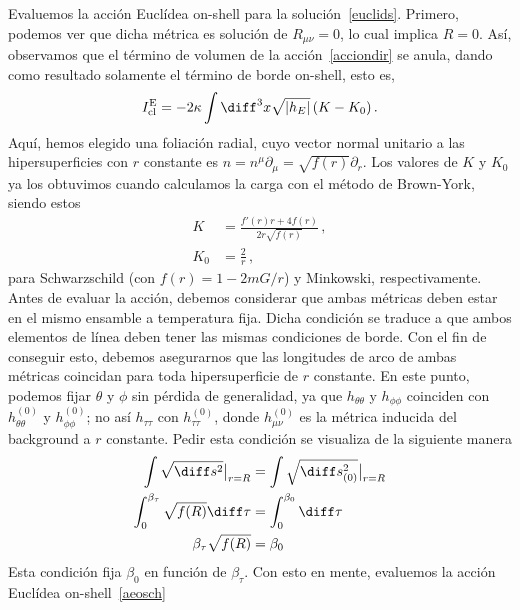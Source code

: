 \documentclass[../Main.tex]{subfiles}
\begin{document}
Evaluemos la acción Euclídea on-shell para la solución~\eqref{euclids}. Primero, podemos ver que dicha métrica es solución de $R_{\mu\nu}=0$, lo cual implica $R=0$. Así, observamos que el término de volumen de la acción~\eqref{acciondir} se anula, dando como resultado solamente el término de borde on-shell, esto es,
\begin{align}
    I^{\rm E}_{\rm cl}=-2\kappa\int \diff^3 x \sqrt{\lvert h_E \rvert}\, (K-K_0)\, . \label{aeosch}
\end{align}
Aquí, hemos elegido una foliación radial, cuyo  vector normal unitario a las hipersuperficies con $r$ constante es $n=n^{\mu}\partial_\mu=\sqrt{f(r)}\partial_r$. Los valores de $K$ y $K_0$ ya los obtuvimos cuando calculamos la carga con el método de Brown-York, siendo estos
\begin{align}
    K&=\frac{f'(r)r+4f(r)}{2r\sqrt{f(r)}}\, \label{curvextri},\\
    K_0&=\frac{2}{r}\, ,
\end{align}
para Schwarzschild (con $f(r)=1-2mG/r$) y  Minkowski, respectivamente. Antes de evaluar la acción, debemos considerar que ambas métricas deben estar en el mismo ensamble a temperatura fija. Dicha condición se traduce a que ambos elementos de línea deben tener las mismas condiciones de borde. Con el fin de conseguir esto, debemos asegurarnos que las longitudes de arco de ambas métricas coincidan para toda hipersuperficie de $r$ constante. En este punto, podemos fijar $\theta$ y $\phi$ sin pérdida de generalidad, ya que $h_{\theta\theta}$ y $h_{\phi\phi}$ coinciden con $h^{(0)}_{\theta\theta}$ y $h^{(0)}_{\phi\phi}$; no así $h_{\tau\tau}$ con $h^{(0)}_{\tau\tau}$, donde $h^{(0)}_{\mu\nu}$ es la métrica inducida del background a $r$ constante. Pedir esta condición se visualiza de la siguiente manera 
\begin{align}\notag
\int \sqrt{\diff s^2}\big|_{r=R}&=\int \sqrt{\diff s^2_{(0)}}\big|_{r=R}\\ \notag
\int_{0}^{\beta_\tau}\sqrt{f(R)}\diff\tau&=\int_{0}^{\beta_0}\diff\tau\\
\beta_\tau\sqrt{f(R)}&=\beta_0 \label{periodo}\,
\end{align}
Esta condición fija $\beta_0$ en función de $\beta_\tau$. Con esto en mente, evaluemos la acción Euclídea on-shell~\eqref{aeosch}
\end{document}
